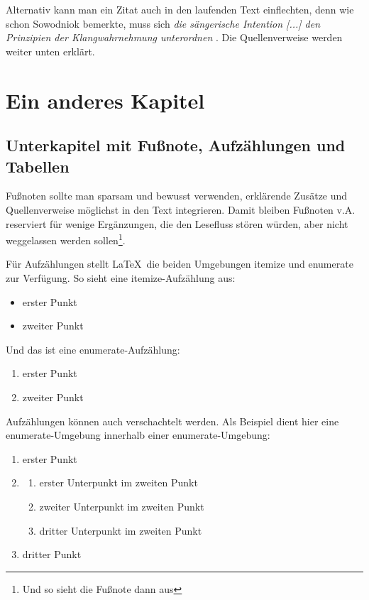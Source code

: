 Alternativ kann man ein Zitat auch in den laufenden Text einflechten, denn wie schon Sowodniok bemerkte, muss sich
\emph{\glqq die sängerische Intention [...] den Prinzipien der Klangwahrnehmung unterordnen\grqq} \citep[111]{sowodniok}.
Die Quellenverweise werden weiter unten erklärt.


\chapter{Ein anderes Kapitel}

\section{Unterkapitel mit Fußnote, Aufzählungen und Tabellen}\label{sec_fussnot}

Fußnoten sollte man sparsam und bewusst verwenden, erklärende Zusätze und Quellenverweise möglichst in den Text integrieren. Damit bleiben Fußnoten v.A. reserviert für wenige Ergänzungen, die den Lesefluss stören würden, aber nicht weggelassen werden sollen\footnote{Und so sieht die Fußnote dann aus}.

Für Aufzählungen stellt \LaTeX\ die beiden Umgebungen itemize und enumerate zur Verfügung. So sieht eine itemize-Aufzählung aus:

\begin{itemize}\setlength{\itemsep}{0ex} %
\item erster Punkt
\item zweiter Punkt
\end{itemize}

Und das ist eine enumerate-Aufzählung:

\begin{enumerate}\setlength{\itemsep}{0ex}
\item erster Punkt
\item zweiter Punkt
\end{enumerate}

Aufzählungen können auch verschachtelt werden. Als Beispiel dient hier eine enumerate-Umgebung innerhalb einer enumerate-Umgebung:

\begin{enumerate}\setlength{\itemsep}{0ex}
\item erster Punkt
\item
	\begin{enumerate}\setlength{\itemsep}{-0.5ex}
	\item erster Unterpunkt im zweiten Punkt
	\item zweiter Unterpunkt im zweiten Punkt
	\item dritter Unterpunkt im zweiten Punkt
	\end{enumerate}
\item dritter Punkt
\end{enumerate}


